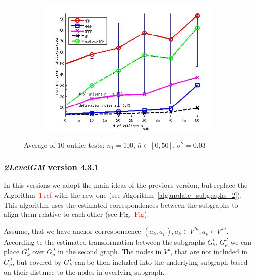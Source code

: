 \documentclass[
	fontsize=12pt,
	paper=a4,
	twoside=false,
	numbers=noenddot,
	plainheadsepline,
	toc=listof,
	toc=bibliography
]{scrartcl}
\newcommand\ToDo[1]{\textcolor{red}{#1}}
\begin{document}
\begin{figure}[h]
\begin{subfigure}[b]{0.3\textwidth}
		\includegraphics[scale=0.25]{"fig_ver2608/syntheticPointSets/ver4.3/outliertest_n50/time_summary_avg10t"} 
	\end{subfigure} 	
	\caption{Average of $10$ outlier tests: $n_1=100$, $\bar{n}\in[0,50]$, $\sigma^2=0.03$}
	\label{fig:test3_ver43}
\end{figure}

\FloatBarrier

\subsubsection{\emph{2LevelGM} version 4.3.1}

In this versions we adopt the main ideas of the previous version, but replace the Algorithm~\ToDo{1 ref} with the new one (see Algorithm~\ref*{alg:update_subgraphs_2}). This algorithm uses the estimated correspondences between the subgraphs to align them relative to each other (see Fig.~\ToDo{Fig}).

Assume, that we have anchor correspondence $(a_k,a_p), a_k\in V^{Ia}, a_p\in V^{Ja}$. According to the estimated transformation between the subgraphs $G_k^I$, $G_p^J$ we can place $G_k^I$ over $G_p^J$ in the second graph. The nodes in $V^J$, that are not included in $G_p^J$, but covered by $G_k^I$ can be then  included into the underlying subgraph based on their distance to the nodes in overlying subgraph.
\end{document}
